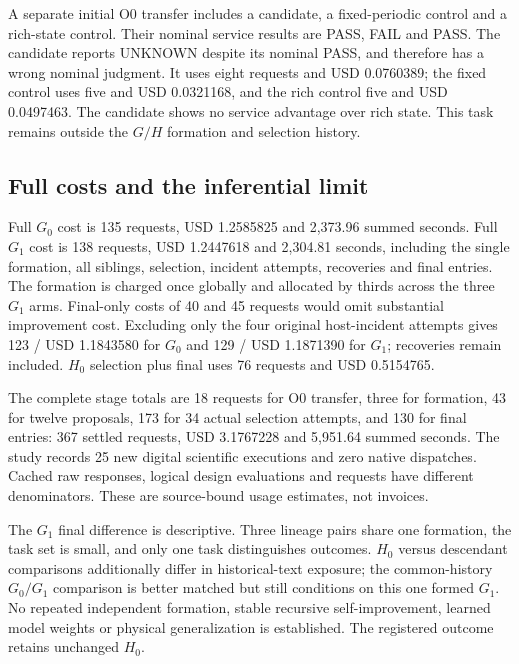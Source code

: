 A separate initial O0 transfer includes a candidate, a fixed-periodic control
and a rich-state control. Their nominal service results are PASS, FAIL and PASS.
The candidate reports UNKNOWN despite its nominal PASS, and therefore has a
wrong nominal judgment. It uses eight requests and USD 0.0760389; the fixed
control uses five and USD 0.0321168, and the rich control five and USD 0.0497463.
The candidate shows no service advantage over rich state. This task remains
outside the $G/H$ formation and selection history.

\subsection{Full costs and the inferential limit}
Full $G_0$ cost is 135 requests, USD 1.2585825 and 2,373.96 summed seconds.
Full $G_1$ cost is 138 requests, USD 1.2447618 and 2,304.81 seconds, including
the single formation, all siblings, selection, incident attempts, recoveries
and final entries. The formation is charged once globally and allocated by
thirds across the three $G_1$ arms. Final-only costs of 40 and 45 requests
would omit substantial improvement cost. Excluding only the four original
host-incident attempts gives 123 / USD 1.1843580 for $G_0$ and
129 / USD 1.1871390 for $G_1$; recoveries remain included. $H_0$ selection plus
final uses 76 requests and USD 0.5154765.

The complete stage totals are 18 requests for O0 transfer, three for formation,
43 for twelve proposals, 173 for 34 actual selection attempts, and 130 for final
entries: 367 settled requests, USD 3.1767228 and 5,951.64 summed seconds.
The study records 25 new digital scientific executions and zero native
dispatches. Cached raw responses, logical design evaluations and requests have
different denominators. These are source-bound usage estimates, not invoices.

The $G_1$ final difference is descriptive. Three lineage pairs share one
formation, the task set is small, and only one task distinguishes outcomes.
$H_0$ versus descendant comparisons additionally differ in historical-text
exposure; the common-history $G_0/G_1$ comparison is better matched but still
conditions on this one formed $G_1$. No repeated independent formation, stable
recursive self-improvement, learned model weights or physical generalization
is established. The registered outcome retains unchanged $H_0$.


